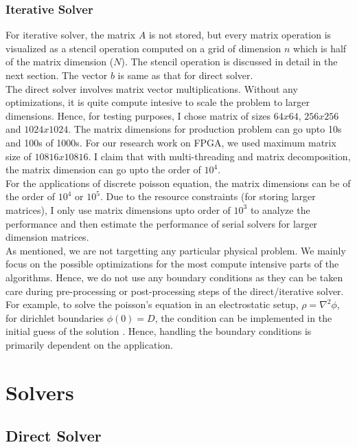 \documentclass{article}
\begin{document}
\begin{spacing}{1.1}
\subsubsection{Iterative Solver}
	For iterative solver, the matrix $A$ is not stored, but every matrix operation is visualized as a stencil operation computed on a grid of dimension $n$ which is half of the matrix dimension ($N$). The stencil operation is discussed in detail in the next section. The vector $b$ is same as that for direct solver.
\\
\newline
 The direct solver involves matrix vector multiplications. Without any optimizations, it is quite compute intesive to scale the problem to larger dimensions. Hence, for testing purposes, I chose matrix of sizes $64x64$, $256x256$ and $1024x1024$. The matrix dimensions for production problem can go upto 10s and 100s of 1000s. For our research work on FPGA, we used maximum matrix size of $10816x10816$. I claim that with multi-threading and matrix decomposition, the matrix dimension can go upto the order of $10^4$.
 \\
 For the applications of discrete poisson equation, the matrix dimensions can be of the order of $10^4$ or $10^5$. Due to the resource constraints (for storing larger matrices), I only use matrix dimensions upto order of $10^3$ to analyze the performance and then estimate the performance of serial solvers for larger dimension matrices.
\\
As mentioned, we are not targetting any particular physical problem. We mainly focus on the possible optimizations for the most compute intensive parts of the algorithms. Hence, we do not use any boundary conditions as they can be taken care during pre-processing or post-processing steps of the direct/iterative solver. For example, to solve the poisson's equation in an electrostatic setup, 
$\rho = \nabla^2\phi$,
for dirichlet boundaries $\phi(0) = D$, the condition can be implemented in the initial guess of the solution \cite{stackexchangeBoundary}. Hence, handling the boundary conditions is primarily dependent on the application.

\section{Solvers}

\subsection{Direct Solver}


\end{spacing}
\end{document}
